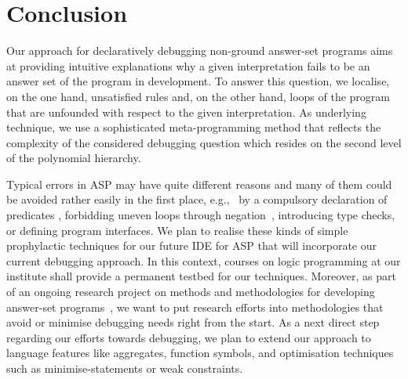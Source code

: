 \documentclass{tlp}
\newcommand{\egc}{e.g.,\ }
\begin{document}
\section{Conclusion}


Our approach for declaratively debugging non-ground an\-swer-set programs
aims at providing intuitive explanations why a given interpretation fails to be an
answer set of the program in development.
To answer this question, we localise, on the one hand, unsatisfied rules
and, on the other hand, loops of the program that are unfounded with respect
to the given interpretation.
As underlying technique, we use a sophisticated meta-programming method
that reflects the complexity of the considered debugging question
which resides on the second level of the polynomial hierarchy.

Typical errors in ASP may have quite different reasons and
many of them could be avoided rather easily in the first place, \egc 
by a compulsory declaration of predicates \cite{brain05},
forbidding uneven loops through negation~\cite{syrjaenen06}, 
introducing type checks, or  defining
program interfaces. 
We plan to realise these kinds of simple prophylactic techniques for our future IDE for ASP that will incorporate our current debugging approach.
In this context,  courses on logic programming at our institute shall provide a permanent testbed for our techniques.
Moreover, as part of an ongoing research project on methods and methodologies for developing answer-set programs~\cite{mmdasp}, we want to put research efforts into methodologies that avoid or minimise debugging needs right from the start.
As a next direct step regarding our  efforts towards debugging,
we plan to extend our approach to language features like aggregates, function symbols, and optimisation techniques such as minimise-statements or weak constraints.
\end{document}
